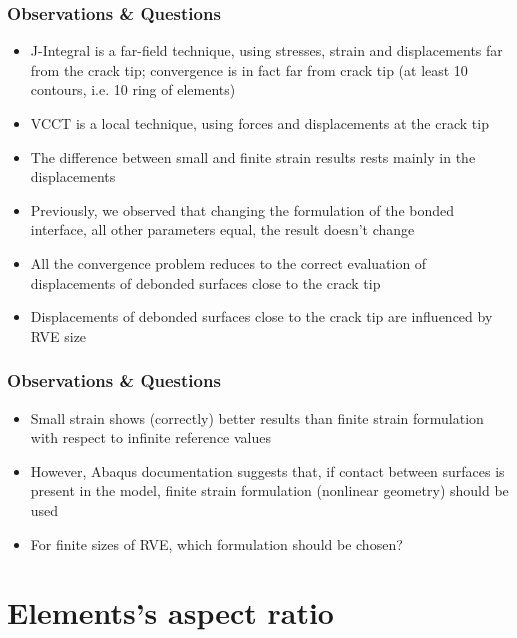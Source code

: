 \documentclass[first,firstsupp,lastsupp,handout,last,hyperref,table]{ETHclass}
\begin{document}
\begin{frame}
\frametitle{\small Observations \& Questions}
\vspace{-0.45cm}
\centering
\begin{itemize}[label=]
\item J-Integral is a far-field technique, using stresses, strain and displacements far from the crack tip; convergence is in fact far from crack tip (at least 10 contours, i.e. 10 ring of elements)
\item VCCT is a local technique, using forces and displacements at the crack tip
\item The difference between small and finite strain results rests mainly in the displacements
\item Previously, we observed that changing the formulation of the bonded interface, all other parameters equal, the result doesn't change
\item All the convergence problem reduces to the correct evaluation of displacements of debonded surfaces close to the crack tip
\item Displacements of debonded surfaces close to the crack tip are influenced by RVE size
\end{itemize}
\end{frame}

\begin{frame}
\frametitle{\small Observations \& Questions}
\vspace{-0.25cm}
\centering
\begin{itemize}[label=]
\item Small strain shows (correctly) better results than finite strain formulation with respect to infinite reference values
\item However, Abaqus documentation suggests that, if contact between surfaces is present in the model, finite strain formulation (nonlinear geometry) should be used
\item For finite sizes of RVE, which formulation should be chosen?
\end{itemize}
\end{frame}

\section{Elements's aspect ratio}
\end{document}
